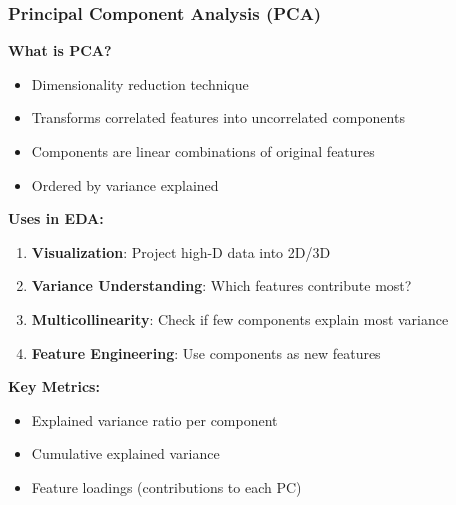 \documentclass[aspectratio=169]{beamer}
\begin{document}
\begin{frame}
\frametitle{Principal Component Analysis (PCA)}

\textbf{What is PCA?}
\begin{itemize}
    \item Dimensionality reduction technique
    \item Transforms correlated features into uncorrelated components
    \item Components are linear combinations of original features
    \item Ordered by variance explained
\end{itemize}

\vspace{0.5cm}

\textbf{Uses in EDA:}
\begin{enumerate}
    \item \textbf{Visualization}: Project high-D data into 2D/3D
    \item \textbf{Variance Understanding}: Which features contribute most?
    \item \textbf{Multicollinearity}: Check if few components explain most variance
    \item \textbf{Feature Engineering}: Use components as new features
\end{enumerate}

\vspace{0.3cm}

\textbf{Key Metrics:}
\begin{itemize}
    \item Explained variance ratio per component
    \item Cumulative explained variance
    \item Feature loadings (contributions to each PC)
\end{itemize}

\end{frame}
\end{document}
